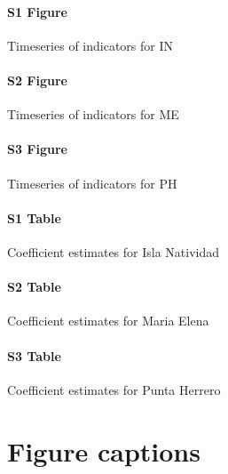 \documentclass{frontiersSCNS}
\theoremstyle{definition}
\theoremstyle{definition}
\theoremstyle{definition}
\theoremstyle{remark}
\begin{document}
\paragraph*{S1 Figure}
\label{S1_Figure}

Timeseries of indicators for IN

\paragraph*{S2 Figure}
\label{S2_Figure}

Timeseries of indicators for ME

\paragraph*{S3 Figure}
\label{S3_Figure}

Timeseries of indicators for PH

\paragraph*{S1 Table}
\label{S1_Table}

Coefficient estimates for Isla Natividad

\paragraph*{S2 Table}
\label{S2_Table}

Coefficient estimates for Maria Elena

\paragraph*{S3 Table}
\label{S3_Table}

Coefficient estimates for Punta Herrero



\section*{Figure captions}
\end{document}
